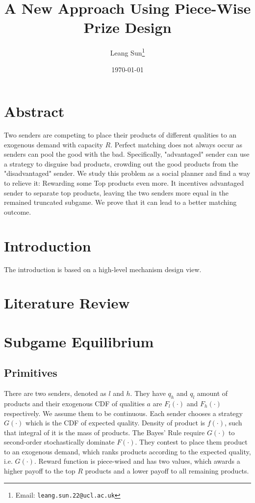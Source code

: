 \documentclass[12pt, a4paper]{article}
\title{A New Approach Using Piece-Wise Prize Design}
\author[1]{Leang Sun\thanks{Email: \texttt{leang.sun.22@ucl.ac.uk}}}
\affil[1]{School of Management, University College London}
\date{\today}
\begin{document}
\onehalfspacing
\setcounter{page}{1}

\section{Abstract}

Two senders are competing to place their products of different qualities to an exogenous demand with capacity $R$. Perfect matching does not always occur as senders can pool the good with the bad. Specifically, "advantaged" sender can use a strategy to disguise bad products, crowding out the good products from the "disadvantaged" sender.  We study this problem as a social planner and find a way to relieve it: Rewarding some Top products even more. It incentives advantaged sender to separate top products, leaving the two senders more equal in the remained truncated subgame. We prove that it can lead to a better matching outcome. 

\section{Introduction}

The introduction is based on a high-level mechanism design view. 

\section{Literature Review}

\section{Subgame Equilibrium}
\label{sec: Subgame Equilibrium}

\subsection{Primitives}

There are two senders, denoted as $l$ and $h$. They have $q_h$ and $q_l$ amount of products and their exogenous CDF of qualities $a$ are $F_l(\cdot)$ and $F_h(\cdot)$ respectively. We assume them to be continuous. Each sender chooses a strategy $G(\cdot)$ which is the CDF of expected quality. Density of product is $f(\cdot)$, such that integral of it is the mass of products. The Bayes' Rule require $G(\cdot)$ to second-order stochastically dominate $F(\cdot)$. They contest to place them product to an exogenous demand, which ranks products according to the expected quality, i.e. $G(\cdot)$. Reward function is piece-wised and has two values, which awards a higher payoff to the top $R$ products and a lower payoff to all remaining products.
\end{document}
